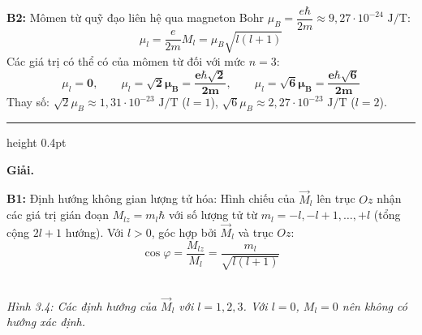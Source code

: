 \documentclass[11pt,a4paper]{article}
\renewcommand{\boldsymbol}[1]{\symbf{#1}}
\let\DeBaiOriginal\DeBai
\renewcommand{\DeBai}[1]{\par\Needspace{5\baselineskip}\DeBaiOriginal{#1}}
\newcommand{\PhanCachBai}{%
  \par\Needspace{7\baselineskip}%
  \addvspace{6pt}%
  {\color{black!40}\hrule height 0.4pt}%
  \nobreak\vspace{7pt}\nobreak
}
\begin{document}
\textbf{B2:} Mômen từ quỹ đạo liên hệ qua magneton Bohr $\mu_B = \dfrac{e\hbar}{2m} \approx 9{,}27 \cdot 10^{-24}\text{ J/T}$:
\begin{equation*}
    \mu_l = \frac{e}{2m} M_l = \mu_B \sqrt{l(l+1)}
\end{equation*}
Các giá trị có thể có của mômen từ đối với mức $n = 3$:
\begin{equation*}
    \mu_l = \boldsymbol{0}, \qquad \mu_l = \boldsymbol{\sqrt{2}\mu_B} = \boldsymbol{\frac{e\hbar\sqrt{2}}{2m}}, \qquad \mu_l = \boldsymbol{\sqrt{6}\mu_B} = \boldsymbol{\frac{e\hbar\sqrt{6}}{2m}}
\end{equation*}
Thay số: $\sqrt{2}\mu_B\approx1{,}31\cdot10^{-23}\text{ J/T}$ ($l=1$), $\sqrt{6}\mu_B\approx2{,}27\cdot10^{-23}\text{ J/T}$ ($l=2$).

\PhanCachBai


\textbf{Giải.}

\textbf{B1:} Định hướng không gian lượng tử hóa:
Hình chiếu của $\vec{M}_l$ lên trục $Oz$ nhận các giá trị gián đoạn $M_{lz} = m_l \hbar$ với số lượng tử từ $m_l = -l, -l+1, \dots, +l$ (tổng cộng $2l + 1$ hướng).
Với $l>0$, góc hợp bởi $\vec{M}_l$ và trục $Oz$:
\begin{equation*}
    \cos\varphi = \frac{M_{lz}}{M_l} = \frac{m_l}{\sqrt{l(l+1)}}
\end{equation*}

\begin{center}\begin{minipage}{\linewidth}\centering
{}\\[2pt]
\textit{Hình 3.4: Các định hướng của $\vec M_l$ với $l=1,2,3$. Với $l=0$, $M_l=0$ nên không có hướng xác định.}
\end{minipage}\end{center}
\end{document}
